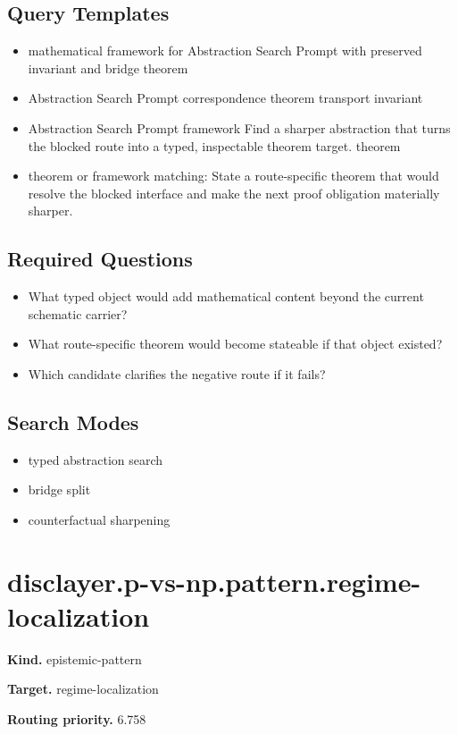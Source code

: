 \documentclass[11pt]{article}
\begin{document}
\subsection*{Query Templates}
\begin{itemize}[leftmargin=*,itemsep=0.2em]
\item mathematical framework for Abstraction Search Prompt with preserved invariant and bridge theorem
\item Abstraction Search Prompt correspondence theorem transport invariant
\item Abstraction Search Prompt framework Find a sharper abstraction that turns the blocked route into a typed, inspectable theorem target. theorem
\item theorem or framework matching: State a route-specific theorem that would resolve the blocked interface and make the next proof obligation materially sharper.
\end{itemize}
\subsection*{Required Questions}
\begin{itemize}[leftmargin=*,itemsep=0.2em]
\item What typed object would add mathematical content beyond the current schematic carrier?
\item What route-specific theorem would become stateable if that object existed?
\item Which candidate clarifies the negative route if it fails?
\end{itemize}
\subsection*{Search Modes}
\begin{itemize}[leftmargin=*,itemsep=0.2em]
\item typed abstraction search
\item bridge split
\item counterfactual sharpening
\end{itemize}
\section{disclayer.p-vs-np.pattern.regime-localization}
\textbf{Kind.} epistemic-pattern

\textbf{Target.} regime-localization

\textbf{Routing priority.} 6.758
\end{document}
